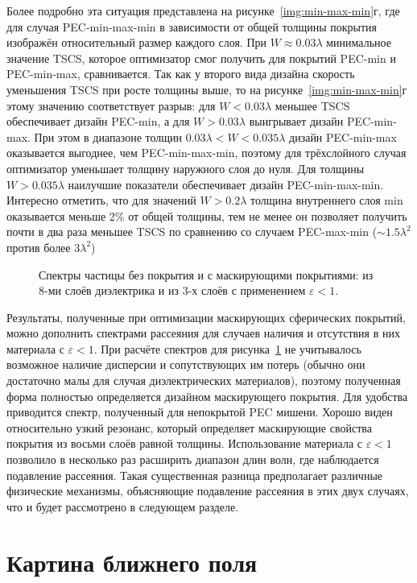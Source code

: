 Более подробно эта ситуация представлена на
рисунке~\ref{img:min-max-min}г, где для случая PEC-min-max-min в
зависимости от общей толщины покрытия изображён относительный размер
каждого слоя. При $W\approx0.03\lambda$ минимальное значение TSCS,
которое оптимизатор смог получить для покрытий PEC-min и PEC-min-max,
сравнивается. Так как у второго вида дизайна скорость уменьшения TSCS
при росте толщины выше, то на рисунке~\ref{img:min-max-min}г этому значению
соответствует разрыв: для $W<0.03\lambda$ меньшее TSCS
обеспечивает дизайн PEC-min, а для $W>0.03\lambda$ выигрывает дизайн
PEC-min-max. При этом в диапазоне толщин
$0.03\lambda < W < 0.035\lambda$ дизайн PEC-min-max оказывается
выгоднее, чем PEC-min-max-min, поэтому для трёхслойного случая
оптимизатор уменьшает толщину наружного слоя до нуля. Для толщины
$W>0.035\lambda$ наилучшие показатели обеспечивает дизайн
PEC-min-max-min. Интересно отметить, что для значений 
$W>0.2\lambda$ толщина внутреннего слоя min оказывается меньше 2\% от
общей толщины, тем не менее он позволяет получить почти в два раза
меньшее TSCS по сравнению со случаем PEC-max-min ($\sim
1.5\lambda^2$ против более $3 \lambda^2$)

\begin{figure}[t]
  \centering
  \caption{ Спектры частицы без покрытия и с маскирующими
    покрытиями: из 8-ми слоёв диэлектрика и из 3-х слоёв с применением
    ${\varepsilon<1}$.\label{img:index07-spectra}
    }
\end{figure}
Результаты, полученные при оптимизации маскирующих сферических покрытий,
можно дополнить спектрами рассеяния для случаев наличия и отсутствия в них
материала с ${\varepsilon<1}$.  При
расчёте спектров для рисунка~\ref{img:index07-spectra} не учитывалось
возможное наличие дисперсии и сопутствующих им потерь (обычно они
достаточно малы для случая диэлектрических материалов), поэтому
полученная форма полностью определяется дизайном маскирующего
покрытия. Для удобства приводится спектр, полученный для непокрытой PEC
мишени.  Хорошо виден относительно узкий резонанс, который определяет
маскирующие свойства покрытия из восьми слоёв равной
толщины. Использование материала с ${\varepsilon<1}$ позволило в
несколько раз расширить диапазон длин волн, где наблюдается подавление
рассеяния.  Такая существенная разница предполагает различные
физические механизмы, объясняющие подавление рассеяния в этих двух
случаях, что и будет рассмотрено в следующем разделе.

\section{Картина ближнего поля}\label{sec:near-field}

